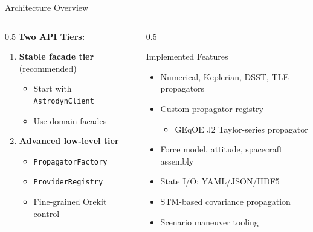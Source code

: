 \documentclass[aspectratio=169,12pt]{beamer}
\begin{document}
\begin{frame}{Architecture Overview}
    \begin{columns}
        \begin{column}{0.5\textwidth}
            \textbf{Two API Tiers:}
            \begin{enumerate}
                \item \textbf{Stable facade tier} (recommended)
                \begin{itemize}
                    \item Start with \texttt{AstrodynClient}
                    \item Use domain facades
                \end{itemize}
                \item \textbf{Advanced low-level tier}
                \begin{itemize}
                    \item \texttt{PropagatorFactory}
                    \item \texttt{ProviderRegistry}
                    \item Fine-grained Orekit control
                \end{itemize}
            \end{enumerate}
        \end{column}
        \begin{column}{0.5\textwidth}
            \begin{block}{Implemented Features}
                \begin{itemize}
                    \item Numerical, Keplerian, DSST, TLE propagators
                    \item Custom propagator registry
                    \begin{itemize}
                        \item GEqOE J2 Taylor-series propagator
                    \end{itemize}
                    \item Force model, attitude, spacecraft assembly
                    \item State I/O: YAML/JSON/HDF5
                    \item STM-based covariance propagation
                    \item Scenario maneuver tooling
                \end{itemize}
            \end{block}
        \end{column}
    \end{columns}
\end{frame}
\end{document}
